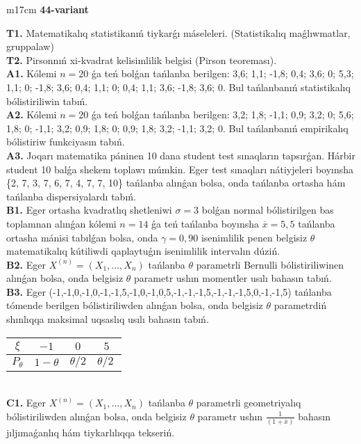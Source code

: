 \documentclass{article}
\begin{document}
\begin{tabular}{m{17cm}}
\textbf{44-variant}
\newline

\textbf{T1.} Matematikalıq statistikanıń tiykarǵı máseleleri. (Statistikalıq maǵlıwmatlar, gruppalaw)
 \\
\textbf{T2.} 
Pirsonnıń xi-kvadrat kelisimlilik belgisi (Pirson teoreması).
 \\
\textbf{A1.} 
Kólemi \(n = 20\) ǵa teń bolǵan tańlanba berilgen: 3,6; 1,1; -1,8; 0,4; 3,6; 0; 5,3; 1,1; 0; -1,8; 3,6; 0,4; 1,1; 0; 0,4; 1,1; 3,6; -1,8; 3,6; 0. Bul tańlanbanıń statistikalıq bólistiriliwin tabıń.
 \\
\textbf{A2.} 
Kólemi \(n = 20\) ǵa teń bolǵan tańlanba berilgen: 3,2; 1,8; -1,1; 0,9; 3,2; 0; 5,6; 1,8; 0; -1,1; 3,2; 0,9; 1,8; 0; 0,9; 1,8; 3,2; -1,1; 3,2; 0. Bul tańlanbanıń empirikalıq bólistiriw funkciyasın tabıń.
 \\
\textbf{A3.} 
Joqarı matematika páninen 10 dana student test sınaqların tapsırǵan. Hárbir student 10 balǵa shekem toplawı múmkin. Eger test sınaqları nátiyjeleri boyınsha \{2, 7, 3, 7, 6, 7, 4, 7, 7, 10\} tańlanba alınǵan bolsa, onda tańlanba ortasha hám tańlanba dispersiyalardı tabıń.
 \\
\textbf{B1.} 
Eger ortasha kvadratlıq shetleniwi \(\sigma = 3\) bolǵan normal bólistirilgen bas toplamnan alınǵan kólemi \(n = 14\) ǵa teń tańlanba boyınsha \(\overline{x} = 5,5\) tańlanba ortasha mánisi tabılǵan bolsa, onda \(\gamma = 0,90\) isenimlilik penen belgisiz \(\theta\) matematikalıq kútiliwdi qaplaytuǵın isenimlilik intervalın dúziń.
 \\
\textbf{B2.} 
Eger \(X^{(n)} = \left( X_{1},...,X_{n} \right)\) tańlanba \(\theta\) parametrli Bernulli bólistiriliwinen alınǵan bolsa, onda belgisiz \(\theta\) parametr ushın momentler usılı bahasın tabıń.
 \\
\textbf{B3.} 
Eger (-1,-1,0,-1,0,-1,-1,5,-1,0,-1,0,5,-1,-1,-1,5,-1,-1,-1,5,0,-1,-1,5) tańlanba tómende berilgen bólistiriliwden alınǵan bolsa, onda belgisiz \(\theta\) parametrdiń shınlıqqa maksimal uqsaslıq usılı bahasın tabıń.
\begin{tabular}{|c|c|c|c|}
  \hline
$\xi$
&
$- 1$
&
$0$
&
$5$\\
\hline
\(P_{\theta}\) & \(1 - \theta\) & \(\theta/2\) & \(\theta/2\ \) \\
\hline
\end{tabular}
 \\
\textbf{C1.} 
Eger \(X^{(n)} = \left( X_{1},...,X_{n} \right)\) tańlanba \(\theta\) parametrli geometriyalıq bólistiriliwden alınǵan bolsa, onda belgisiz \(\theta\) parametr ushın \(\frac{1}{(1 + \overline{x})}\) bahasın jıljımaǵanlıq hám tiykarlılıqqa tekseriń.

\end{tabular}
\end{document}
